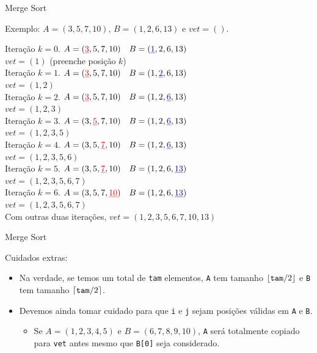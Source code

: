 \documentclass[handout]{beamer}
\newcommand{\cod}[1]{\texttt{#1}}
\begin{document}
\begin{frame}[fragile]{Merge Sort}

    Exemplo: $A = (3,5,7,10)$, $B = (1,2,6,13)$ e $vet = ()$.

    \small
    Iteração $k = 0$.
    $A = ({\color{red}\underline{3}},5,7,10) \quad B = ({\color{blue}{\underline{1}}},2,6,13)$\\
    $vet = (1)$ (preenche posição $k$)\\
    Iteração $k = 1$.
    $A = ({\color{red}\underline{3}},5,7,10) \quad B = (1,{\color{blue}{\underline{2}}},6,13)$\\
    $vet = (1,2)$\\
    Iteração $k = 2$.
    $A = ({\color{red}\underline{3}},5,7,10) \quad B = (1,2,{\color{blue}{\underline{6}}},13)$\\
    $vet = (1,2,3)$\\
    Iteração $k = 3$.
    $A = (3,{\color{red}\underline{5}},7,10) \quad B = (1,2,{\color{blue}{\underline{6}}},13)$\\
    $vet = (1,2,3,5)$\\
    Iteração $k = 4$.
    $A = (3,5,{\color{red}\underline{7}},10) \quad B = (1,2,{\color{blue}{\underline{6}}},13)$\\
    $vet = (1,2,3,5,6)$\\
    Iteração $k = 5$.
    $A = (3,5,{\color{red}\underline{7}},10) \quad B = (1,2,6,{\color{blue}{\underline{13}}})$\\
    $vet = (1,2,3,5,6,7)$\\
    Iteração $k = 6$.
    $A = (3,5,7,{\color{red}\underline{10}}) \quad B = (1,2,6,{\color{blue}{\underline{13}}})$\\
    $vet = (1,2,3,5,6,7)$\\
    Com outras duas iterações, $vet = (1,2,3,5,6,7,10,13)$

\end{frame}

\begin{frame}[fragile]{Merge Sort}

    Cuidados extras:
    \begin{itemize}
        \item Na verdade, se temos um total de \cod{tam} elementos, \cod{A} tem tamanho $\lfloor \mbox{\cod{tam}}/2 \rfloor$ e \cod{B} tem tamanho $\lceil \mbox{\cod{tam}}/2 \rceil$.
        \item Devemos ainda tomar cuidado para que \cod{i} e \cod{j} sejam posições válidas em \cod{A} e \cod{B}.
        \begin{itemize}
            \item Se $A = (1,2,3,4,5)$ e $B = (6,7,8,9,10)$, \cod{A} será totalmente copiado para \cod{vet} antes mesmo que \cod{B[0]} seja considerado.
        \end{itemize}
    \end{itemize}

\end{frame}
\end{document}
